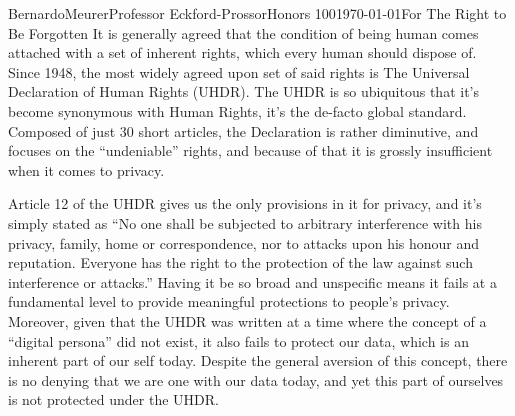 \documentclass[12pt,letterpaper]{article}
\begin{document}
\begin{mla}{Bernardo}{Meurer}{Professor Eckford-Prossor}{Honors 100}{\today}{For The Right to Be Forgotten}
    It is generally agreed that the condition of being human comes attached with a set of inherent rights, which every human should dispose of.
    Since 1948, the most widely agreed upon set of said rights is The Universal Declaration of Human Rights (UHDR).
    The UHDR is so ubiquitous that it's become synonymous with Human Rights, it's the de-facto global standard.
    Composed of just 30 short articles, the Declaration is rather diminutive, and focuses on the ``undeniable'' rights, and because of that it is grossly insufficient when it comes to privacy.

    Article 12 of the UHDR gives us the only provisions in it for privacy, and it's simply stated as ``No one shall be subjected to arbitrary interference with his privacy, family, home or correspondence, nor to attacks upon his honour and reputation. Everyone has the right to the protection of the law against such interference or attacks.'' Having it be so broad and unspecific means it fails at a fundamental level to provide meaningful protections to people's privacy.
    Moreover, given that the UHDR was written at a time where the concept of a ``digital persona'' did not exist, it also fails to protect our data, which is an inherent part of our self today. Despite the general aversion of this concept, there is no denying that we are one with our data today, and yet this part of ourselves is not protected under the UHDR.


\end{mla}
\end{document}

